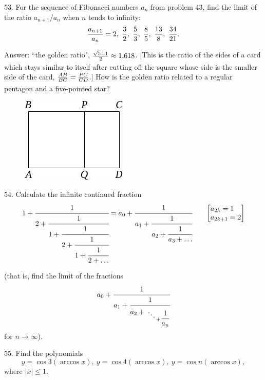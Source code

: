 \begin{problem}{53.}
	For the sequence of Fibonacci numbers $a_n$ from problem 43, find the limit of the ratio 
	$a_{n+1}/a_n$ when $n$ tends to infinity:\vspace{2\jot}
	\[
	\frac{a_{n+1}}{a_n}=2,\ \frac 32,\ \frac53, \ \frac85, \ \frac{13}8,
	\ \frac{34}{21}.
	\vspace{\jot}
	\] 

	\begin{note}{Answer:}
		``the golden ratio",
		$\frac{\sqrt{5}+1}{2\vphantom)} \approx 1{,}618$. [This is the ratio of the sides of a card which stays
		similar to itself after cutting off the square whose side is the smaller side of the card,
		  $\frac{AB}{BC}=\frac{PC}{CD\vphantom)}$.] How is the golden ratio related to a regular pentagon and a five-pointed star? 

		\begin{figure}[h]
		\centering
		 \includegraphics{taskbook-37}
		\end{figure}
	\end{note}
\end{problem}

\begin{problem}{54.}
	Calculate the infinite continued fraction
	\begin{align*}
	1+\cfrac{1}{2+\cfrac{1}{1+\cfrac{1}{2+\cfrac{1}{1+\cfrac{1}{2+\ldots}}}}}=
	a_0+\cfrac{1}{a_1+\cfrac{1}{a_2+\cfrac{1}{a_3+\dots}}} \qquad
	\smash{
	{\left[\begin{aligned} &a_{2k}=1 \\[-\jot] &a_{2k+1}
		  =2 \end{aligned}\right]} }
	\end{align*}

	\medskip

	\noindent (that is, find the limit of the fractions
	$$
	a_0+\cfrac{1}{a_1+\cfrac{1}{a_2+{\atop{\ddots \atop {}} + \cfrac{1}{a_n}}
	} 
	}
	$$
	for $n \to \infty$).
\end{problem}

\begin{problem}{55.}
	Find the polynomials 
	\[
	y=\cos 3 (\arccos x),\  y=\cos 4 (\arccos x),\ 
	y=\cos n (\arccos x),
	\] 
	where $|x| \leqslant 1$. 
\end{problem}


